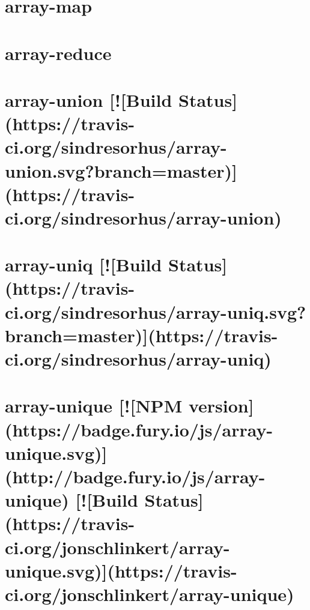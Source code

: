 \documentclass[twoside]{book}
\newcommand{\+}{\discretionary{\mbox{\scriptsize$\hookleftarrow$}}{}{}}
\begin{document}
\chapter{array-\/map}
\label{md__c_1_workspace_demo_src_main_script_node_modules_array-map_readme}

\chapter{array-\/reduce}
\label{md__c_1_workspace_demo_src_main_script_node_modules_array-reduce_readme}

\chapter{array-\/union \mbox{[}!\mbox{[}Build Status\mbox{]}(https\+://travis-\/ci.org/sindresorhus/array-\/union.svg?branch=master)\mbox{]}(https\+://travis-\/ci.org/sindresorhus/array-\/union)}
\label{md__c_1_workspace_demo_src_main_script_node_modules_array-union_readme}

\chapter{array-\/uniq \mbox{[}!\mbox{[}Build Status\mbox{]}(https\+://travis-\/ci.org/sindresorhus/array-\/uniq.svg?branch=master)\mbox{]}(https\+://travis-\/ci.org/sindresorhus/array-\/uniq)}
\label{md__c_1_workspace_demo_src_main_script_node_modules_array-uniq_readme}

\chapter{array-\/unique \mbox{[}!\mbox{[}N\+PM version\mbox{]}(https\+://badge.fury.\+io/js/array-\/unique.svg)\mbox{]}(http\+://badge.fury.\+io/js/array-\/unique) \mbox{[}!\mbox{[}Build Status\mbox{]}(https\+://travis-\/ci.org/jonschlinkert/array-\/unique.svg)\mbox{]}(https\+://travis-\/ci.org/jonschlinkert/array-\/unique)}
\label{md__c_1_workspace_demo_src_main_script_node_modules_array-unique__r_e_a_d_m_e}

\end{document}
